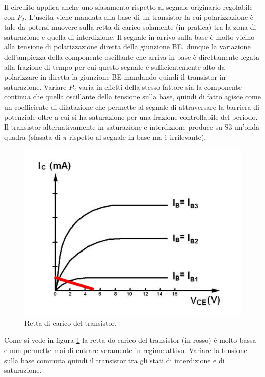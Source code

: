 \documentclass[10pt,a4paper]{article}
\begin{document}
Il circuito applica anche uno sfasamento rispetto al segnale originario regolabile con $P_2$. L'uscita viene mandata alla base di un transistor la cui polarizzazione è tale da potersi muovere sulla retta di carico solamente (in pratica) tra la zona di saturazione e quella di interdizione. Il segnale in arrivo sulla base è molto vicino alla tensione di polarizzazione diretta della giunzione BE, dunque la variazione dell'ampiezza della componente oscillante che arriva in base è direttamente legata alla frazione di tempo per cui questo segnale è sufficientemente alto da polarizzare in diretta la giunzione BE mandando quindi il transistor in saturazione. Variare $P_2$ varia in effetti della stesso fattore sia la componente continua che quella oscillante della tensione sulla base, quindi di fatto agisce come un coefficiente di dilatazione che permette al segnale di attraversare la barriera di potenziale oltre a cui si ha saturazione per una frazione controllabile del periodo.
Il transistor alternativamente in saturazione e interdizione produce su S3 un'onda quadra (sfasata di $\pi$ rispetto al segnale in base ma è irrilevante).\\


\begin{figure}[!htb]
  \centering
  \includegraphics[scale=0.75]{transistor.jpg}
\caption{Retta di carico del transistor.\label{fig:transistor}}
\end{figure}

Come si vede in figura \ref{fig:transistor} la retta do carico del transistor (in rosso) è molto bassa e non permette mai di entrare veramente in regime attivo. Variare la tensione sulla base commuta quindi il transistor tra gli stati di interdizione e di saturazione.\\
\end{document}
